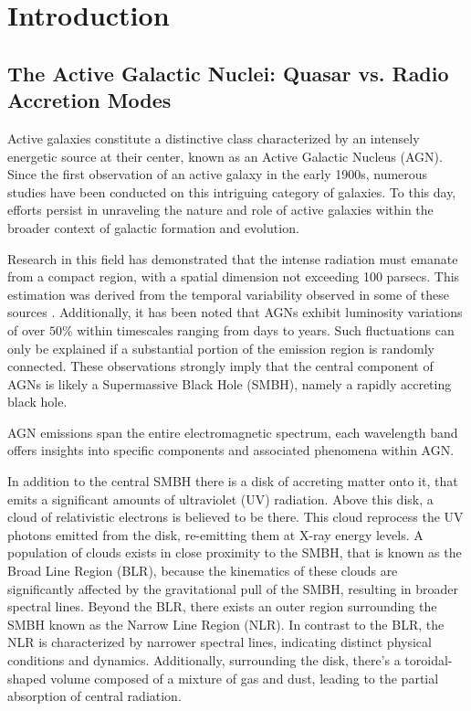 \chapter{Introduction}

\section{The Active Galactic Nuclei: Quasar vs. Radio Accretion Modes}
Active galaxies constitute a distinctive class characterized by an intensely energetic source at their center, known as an Active Galactic Nucleus (AGN). Since the first observation of an active galaxy in the early 1900s, numerous studies have been conducted on this intriguing category of galaxies. To this day, efforts persist in unraveling the nature and role of active galaxies within the broader context of galactic formation and evolution.

Research in this field has demonstrated that the intense radiation must emanate from a compact region, with a spatial dimension not exceeding 100 parsecs. This estimation was derived from the temporal variability observed in some of these sources \cite{1959ApJ...130...38W}. Additionally, it has been noted that AGNs exhibit luminosity variations of over $50\%$ within timescales ranging from days to years. Such fluctuations can only be explained if a substantial portion of the emission region is randomly connected. These observations strongly imply that the central component of AGNs is likely a Supermassive Black Hole (SMBH), namely a rapidly accreting black hole.

AGN emissions span the entire electromagnetic spectrum, each wavelength band offers insights into specific components and associated phenomena within AGN. 

In addition to the central SMBH \cite{2006ApJ...652..216R} there is a disk of accreting matter onto it, that emits a significant amounts of ultraviolet (UV) radiation. Above this disk, a cloud of relativistic electrons is believed to be there. This cloud reprocess the UV photons emitted from the disk, re-emitting them at X-ray energy levels.
A population of clouds exists in close proximity to the SMBH, that is known as the Broad Line Region
(BLR), because the kinematics of these clouds are significantly affected by the gravitational pull of the SMBH, resulting in broader spectral lines. Beyond the BLR, there exists an outer region surrounding the SMBH known as the Narrow Line Region (NLR). In contrast to the BLR, the NLR is characterized by narrower spectral lines, indicating distinct physical conditions and dynamics. 
 Additionally, surrounding the disk, there's a toroidal-shaped volume composed of a mixture of gas and dust, leading to the partial absorption of central radiation.

